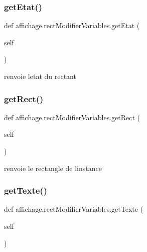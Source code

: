 \subsubsection{\texorpdfstring{get\+Etat()}{getEtat()}}
{\footnotesize\ttfamily def affichage.\+rect\+Modifier\+Variables.\+get\+Etat (\begin{DoxyParamCaption}\item[{}]{self }\end{DoxyParamCaption})}



renvoie l\textquotesingle{}etat du rectant 

\mbox{\label{classaffichage_1_1rect_modifier_variables_a475182511e9c8824f4086dc4b7c8468c}} 
\subsubsection{\texorpdfstring{get\+Rect()}{getRect()}}
{\footnotesize\ttfamily def affichage.\+rect\+Modifier\+Variables.\+get\+Rect (\begin{DoxyParamCaption}\item[{}]{self }\end{DoxyParamCaption})}



renvoie le rectangle de l\textquotesingle{}instance 

\mbox{\label{classaffichage_1_1rect_modifier_variables_a7be1daba962628cf305415a2e4ec3312}} 
\subsubsection{\texorpdfstring{get\+Texte()}{getTexte()}}
{\footnotesize\ttfamily def affichage.\+rect\+Modifier\+Variables.\+get\+Texte (\begin{DoxyParamCaption}\item[{}]{self }\end{DoxyParamCaption})}



